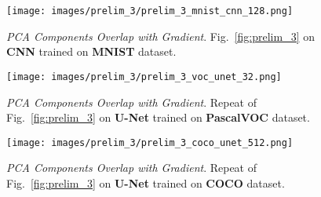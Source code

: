 \begin{figure}[h!]
  \centering
  \centerline{\texttt{[image: images/prelim\_3/prelim\_3\_mnist\_cnn\_128.png]}}
  \caption{\small{\textit{PCA Components Overlap with Gradient}. Fig.~\ref{fig:prelim_3} on \textbf{CNN} trained on \textbf{MNIST} dataset.}}
  \label{fig:prelim_3_mnist_cnn}
\end{figure}


\begin{figure}[h!]
  \centering
  \centerline{\texttt{[image: images/prelim\_3/prelim\_3\_voc\_unet\_32.png]}}
  \caption{\small{\textit{PCA Components Overlap with Gradient}. Repeat of Fig.~\ref{fig:prelim_3} on \textbf{U-Net} trained on \textbf{PascalVOC} dataset.}}
  \label{fig:prelim_3_voc_unet}
\end{figure}

\begin{figure}[h!]
  \centering
  \centerline{\texttt{[image: images/prelim\_3/prelim\_3\_coco\_unet\_512.png]}}
  \caption{\small{\textit{PCA Components Overlap with Gradient}. Repeat of Fig.~\ref{fig:prelim_3} on \textbf{U-Net} trained on \textbf{COCO} dataset.}}
  \label{fig:prelim_3_coco_unet}
\end{figure}